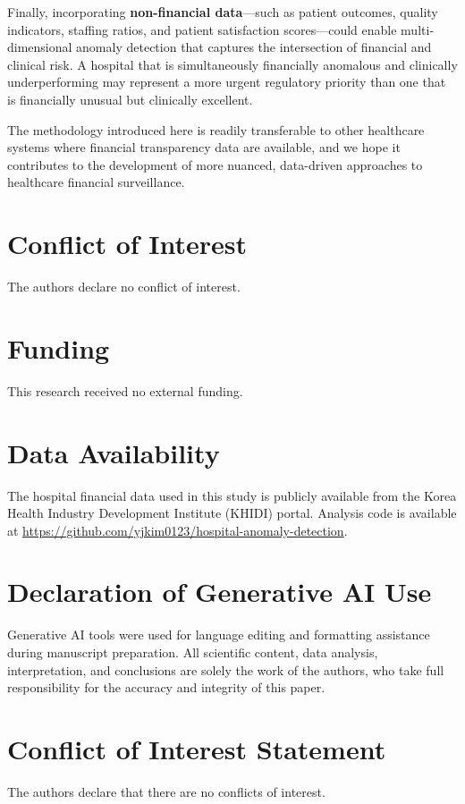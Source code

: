 \documentclass{ieeeaccess}
\begin{document}
Finally, incorporating \textbf{non-financial data}---such as patient outcomes, quality indicators, staffing ratios, and patient satisfaction scores---could enable multi-dimensional anomaly detection that captures the intersection of financial and clinical risk. A hospital that is simultaneously financially anomalous and clinically underperforming may represent a more urgent regulatory priority than one that is financially unusual but clinically excellent.

The methodology introduced here is readily transferable to other healthcare systems where financial transparency data are available, and we hope it contributes to the development of more nuanced, data-driven approaches to healthcare financial surveillance.

\section*{Conflict of Interest}
The authors declare no conflict of interest.

\section*{Funding}
This research received no external funding.

\section*{Data Availability}
The hospital financial data used in this study is publicly available from the Korea Health Industry Development Institute (KHIDI) portal. Analysis code is available at \url{https://github.com/yjkim0123/hospital-anomaly-detection}.

\section*{Declaration of Generative AI Use}
Generative AI tools were used for language editing and formatting assistance during manuscript preparation.
All scientific content, data analysis, interpretation, and conclusions are solely the work of the authors, who take full responsibility for the accuracy and integrity of this paper.

\section*{Conflict of Interest Statement}
The authors declare that there are no conflicts of interest.
\end{document}
